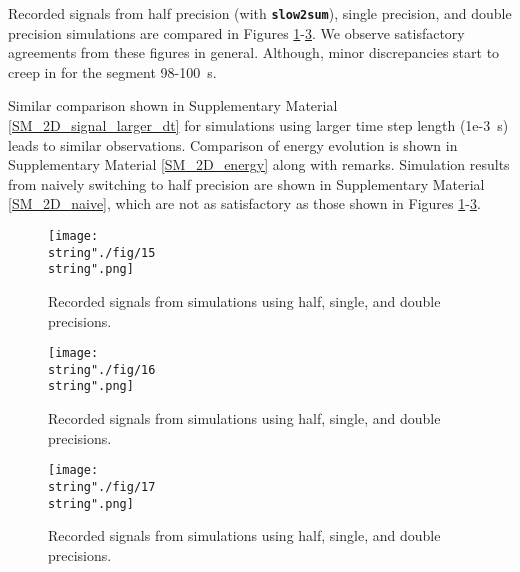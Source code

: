 \documentclass[10pt]{article}
\begin{document}
Recorded signals from half precision (with \textbf{\texttt{\small slow2sum}}), single precision, and double precision simulations are compared in Figures \ref{comparison_V_half_compensated_single_double_ppw_10_seg_0_2_marmousi2}-\ref{comparison_V_half_compensated_single_double_ppw_10_seg_98_100_marmousi2}.
%
We observe satisfactory agreements from these figures in general.
%
Although, minor discrepancies start to creep in for the segment 98-100~s.%
\footnotemark
{}


Similar comparison shown in Supplementary Material \ref{SM_2D_signal_larger_dt} for simulations using larger time step length (1e-3~s) leads to similar observations. 
%
Comparison of energy evolution is shown in Supplementary Material \ref{SM_2D_energy} along with remarks.
%
Simulation results from naively switching to half precision are shown in Supplementary Material \ref{SM_2D_naive}, which are not as satisfactory as those shown in Figures \ref{comparison_V_half_compensated_single_double_ppw_10_seg_0_2_marmousi2}-\ref{comparison_V_half_compensated_single_double_ppw_10_seg_98_100_marmousi2}.


\begin{figure}[H]
\captionsetup{width=1\textwidth, font=footnotesize,labelfont=footnotesize}
\centering\texttt{[image: \\string"./fig/15\\string".png]}
\caption{Recorded signals from simulations using half, single, and double precisions.}
\label{comparison_V_half_compensated_single_double_ppw_10_seg_0_2_marmousi2}
\end{figure}
%
\begin{figure}[H]
\captionsetup{width=1\textwidth, font=footnotesize,labelfont=footnotesize}
\centering\texttt{[image: \\string"./fig/16\\string".png]}
\caption{Recorded signals from simulations using half, single, and double precisions.}
\label{comparison_V_half_compensated_single_double_ppw_10_seg_10_12_marmousi2}
\end{figure}
%
\begin{figure}[H]
\captionsetup{width=1\textwidth, font=footnotesize,labelfont=footnotesize}
\centering\texttt{[image: \\string"./fig/17\\string".png]}
\caption{Recorded signals from simulations using half, single, and double precisions.}
\label{comparison_V_half_compensated_single_double_ppw_10_seg_98_100_marmousi2}
\end{figure}
\end{document}
